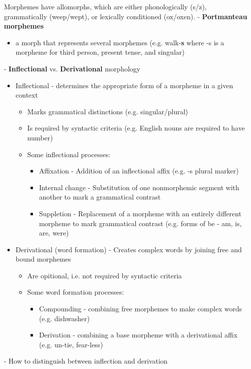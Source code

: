 \documentclass[11pt]{article}
\begin{document}
Morphemes have allomorphs, which are either phonologically (s/z), grammatically (weep/wept), or lexically conditioned (ox/oxen).
- {\bf Portmanteau morphemes}
\begin{itemize}
 \item a morph that represents several morphemes (e.g. walk-{\bf s} where -s is a morpheme for third person, present tense, and singular)
\end{itemize}
- {\bf Inflectional} vs. {\bf Derivational} morphology
\begin{itemize}
 \item Inflectional - determines the appropriate form of a morpheme in a given context
  \begin{itemize}
   \item Marks grammatical distinctions (e.g. singular/plural) 
   \item Is required by syntactic criteria (e.g. English nouns are required to have number)
   \item Some inflectional processes:
    \begin{itemize}
     \item Affixation - Addition of an inflectional affix (e.g. -s plural marker)
     \item Internal change - Substitution of one nonmorphemic segment with another to mark a grammatical contrast
     \item Suppletion - Replacement of a morpheme with an entirely different morpheme to mark grammatical contrast (e.g. forms of be - am, is, are, were)
    \end{itemize}
  \end{itemize}
 \item Derivational (word formation) - Creates complex words by joining free and bound morphemes 
  \begin{itemize}
   \item Are opitional, i.e. not required by syntactic criteria
   \item Some word formation processes:
    \begin{itemize}
     \item Compounding - combining free morphemes to make complex words (e.g. dishwasher)
     \item Derivation - combining a base morpheme with a derivational affix (e.g. un-tie, fear-less)
    \end{itemize}
  \end{itemize}
\end{itemize}
- How to distinguish between inflection and derivation
\end{document}
